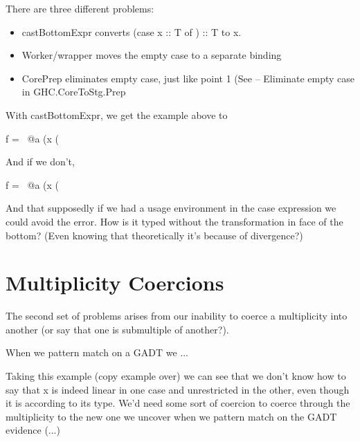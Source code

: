 \documentclass[a4paper, draft]{article}
\begin{document}

There are three different problems:

\begin{itemize}
\item castBottomExpr converts (case x :: T of {}) :: T to x.
\item Worker/wrapper moves the empty case to a separate binding
\item CorePrep eliminates empty case, just like point 1 (See -- Eliminate empty
    case in GHC.CoreToStg.Prep
\end{itemize}

With castBottomExpr, we get the example above to
\begin{code}
    f = \ @a (x (%
\end{code}
And if we don't, 
\begin{code}
    f = \ @a (x (%
\end{code}
And that supposedly if we had a usage environment in the case expression we
could avoid the error. How is it typed without the transformation in face
of the bottom? (Even knowing that theoretically it's because of divergence?)



\section{Multiplicity Coercions}

The second set of problems arises from our inability to coerce a multiplicity
into another (or say that one is submultiple of another?).

When we pattern match on a GADT we ...

Taking this example (copy example over) we can see that we don't know how to say
that x is indeed linear in one case and unrestricted in the other, even though
it is according to its type. We'd need some sort of coercion to coerce through
the multiplicity to the new one we uncover when we pattern match on the GADT
evidence (...)
\end{document}
